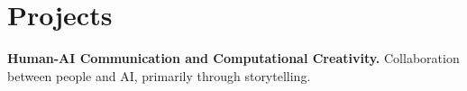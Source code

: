 \section*{{} Projects}







{\color{dark-teal} {\bf Human-AI Communication and Computational Creativity.}} {\bodyfontlight\color{darktext} Collaboration between people and AI, primarily through storytelling.}

